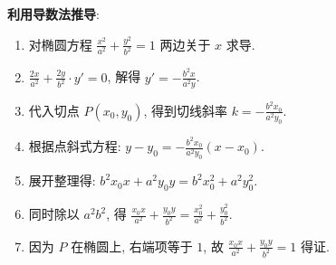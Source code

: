 \begin{proofbox}
\textbf{利用导数法推导}:
\begin{enumerate}
    \item 对椭圆方程 $\frac{x^2}{a^2} + \frac{y^2}{b^2} = 1$ 两边关于 $x$ 求导.
    \item $\frac{2x}{a^2} + \frac{2y}{b^2} \cdot y' = 0$, 解得 $y' = -\frac{b^2x}{a^2y}$.
    \item 代入切点 $P(x_0, y_0)$, 得到切线斜率 $k = -\frac{b^2x_0}{a^2y_0}$.
    \item 根据点斜式方程: $y - y_0 = -\frac{b^2x_0}{a^2y_0}(x - x_0)$.
    \item 展开整理得: $b^2x_0x + a^2y_0y = b^2x_0^2 + a^2y_0^2$.
    \item 同时除以 $a^2b^2$, 得 $\frac{x_0x}{a^2} + \frac{y_0y}{b^2} = \frac{x_0^2}{a^2} + \frac{y_0^2}{b^2}$.
    \item 因为 $P$ 在椭圆上, 右端项等于 $1$, 故 $\frac{x_0x}{a^2} + \frac{y_0y}{b^2} = 1$ 得证.
\end{enumerate}
\end{proofbox}